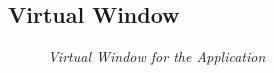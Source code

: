 



 

  




\subsection{Virtual Window}
\begin{figure}
 
\begin{center}

  \caption{\emph{Virtual Window for the Application}}
  

\end{center}    
\end{figure}



